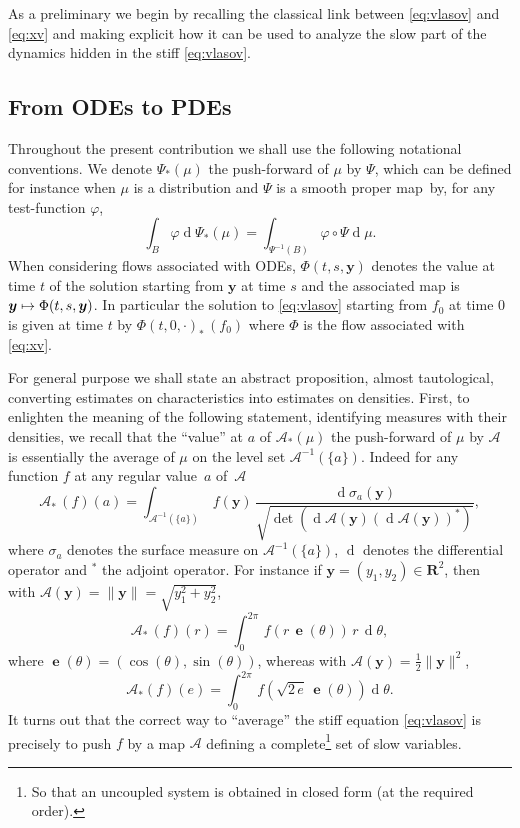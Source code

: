 \documentclass[10pt]{amsart}
\let\mathcal\mathscr
\newcommand\mto{\mathchoice{\longmapsto}{\mapsto}{\mapsto}{\mapsto}}
\DeclareMathOperator\dD{d}\let\dd\dD
\theoremstyle{plain}
\theoremstyle{definition}
\newcommand\R{\mathbf R}
\newcommand\bfy{{\boldsymbol y}}
\newcommand\cA{{\mathcal A}}
\DeclareMathOperator{\beD}{\boldsymbol{e}}
\begin{document}
As a preliminary we begin by recalling the classical link between \eqref{eq:vlasov} and \eqref{eq:xv} and making explicit how it can be used to analyze the slow part of the dynamics hidden in the stiff \eqref{eq:vlasov}.

\subsection{From ODEs to PDEs}\label{s:PDE}

Throughout the present contribution we shall use the following notational
conventions. We denote $\Psi_*(\mu)$ the push-forward of $\mu$ by $\Psi$,
which can be defined for instance when $\mu$ is a distribution and $\Psi$
is a smooth proper map~by, for any test-function $\varphi$,
\[
\int_{B} \varphi \dD \Psi_*(\mu)= \int_{\Psi^{-1}(B)} \varphi\circ \Psi \dD \mu.
\]
When considering flows associated with ODEs, $\Phi(t,s,\bfy)$ denotes the value at time $t$ of the solution starting from $\bfy$ at time $s$ and the associated map is $\bfy\mto \Phi(t,s,\bfy)$. In particular the solution to \eqref{eq:vlasov} starting from $f_0$ at time $0$ is given at time $t$ by $\Phi(t,0,\cdot)_*\,(f_0)$ where $\Phi$ is the flow associated with \eqref{eq:xv}.

For general purpose we shall state an abstract proposition, almost tautological, converting estimates on characteristics into estimates on densities. First, to enlighten the meaning of the following statement, identifying measures with their densities, we recall that the ``value'' at $a$ of $\cA_*(\mu)$ the push-forward of $\mu$ by $\cA$ is essentially the average of $\mu$ on the level set $\cA^{-1}(\{a\})$. Indeed for any function $f$ at any regular value~$a$ of~$\cA$
\[
\cA_*\,(f)(a)=\int_{\cA^{-1}(\{a\})}\,f(\bfy)\,\frac{\dD \sigma_a(\bfy)}{\sqrt{\det(\dD\cA(\bfy)(\dD \cA(\bfy))^*)}},
\]
where $\sigma_a$ denotes the surface measure on $\cA^{-1}(\{a\})$, $\dD$ denotes the differential operator and ${}^*$ the adjoint operator. For instance if $\bfy=(y_1,y_2)\in\R^2$, then with $\cA(\bfy)=\|\bfy\|=\sqrt{y_1^2+y_2^2}$,
\[
\cA_*\,(f)(r)=\int_0^{2\pi}\,f(r\,\beD(\theta))\,r\,\dD \theta,
\]
where $\beD(\theta)=(\cos(\theta),\sin(\theta))$, whereas with $\cA(\bfy)=\tfrac12\|\bfy\|^2$,
\[
\cA_*(f)(e)=\int_0^{2\pi}\,f(\sqrt{2\,e}\,\beD(\theta))\dD \theta.
\]
It turns out that the correct way to ``average'' the stiff equation \eqref{eq:vlasov} is precisely to push $f$ by a map $\cA$ defining a complete\footnote{So that an uncoupled system is obtained in closed form (at the required order).} set of slow variables.
\end{document}
